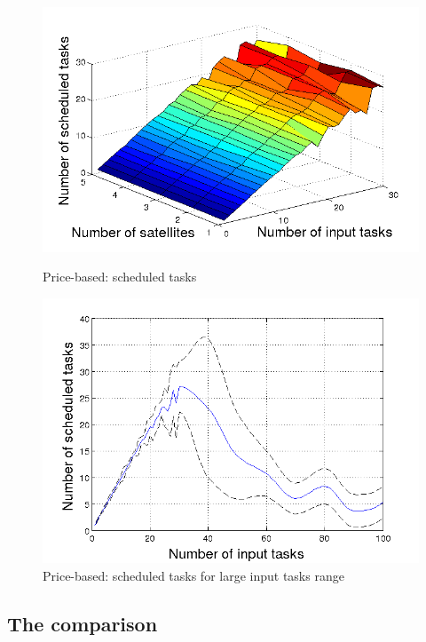 \begin{figure}[h!]
  \begin{minipage}[b]{0.5\linewidth}
    \includegraphics[width=\linewidth]{Figures/aMB_sw.png}
    \caption{Price-based: scheduled tasks}\label{fig_aMB_sw}
  \end{minipage}
    \begin{minipage}[b]{0.5\linewidth}
    \includegraphics[width=\linewidth]{Figures/aMB.png}
    \caption{Price-based: scheduled tasks for large input tasks range}\label{fig_aMB}
  \end{minipage}
  \hfill
\end{figure}

\clearpage


\subsection{The comparison}

